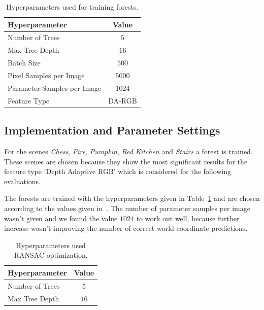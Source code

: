 \documentclass[final]{cvpr}
\begin{document}
\begin{table}[h!]
	\begin{center}
	\begin{tabular}{|l|c|}
	\hline
	Hyperparameter & Value \\
	\hline\hline
	Number of Trees & $5$ \\
	Max Tree Depth & $16$ \\
	Batch Size & $500$ \\
	Pixel Samples per Image & $5000$ \\
	Parameter Samples per Image  & $1024$ \\
	Feature Type & DA-RGB \\
	\hline
	\end{tabular}
	\end{center}
	\caption{Hyperparameters used for training forests.}
	\label{tab:params-forest}
\end{table}

\subsection{Implementation and Parameter Settings}
For the scenes \textit{Chess}, \textit{Fire},  \textit{Pumpkin},  \textit{Red Kitchen} and  \textit{Stairs} a forest is
trained. These scenes are chosen because they show the most significant results for the feature type 'Depth Adaptive RGB' 
which is considered for the following evaluations.

The forests are trained with the hyperparameters given in Table~\ref{tab:params-forest} and are chosen according to the 
values given in~\cite{shotton2013}. The number of parameter samples per image wasn't given and we found the
value $1024$ to work out well, because further increase wasn't improving the number of correct world coordinate predictions.

\begin{table}[h!]
	\begin{center}
	\begin{tabular}{|l|c|}
	\hline
	Hyperparameter & Value \\
	\hline\hline
	Number of Trees & $5$ \\
	Max Tree Depth & $16$ \\
	\hline
	\end{tabular}
	\end{center}
	\label{tab:params-ransac}
	\caption{Hyperparameters used RANSAC optimization.}
\end{table}
\end{document}
